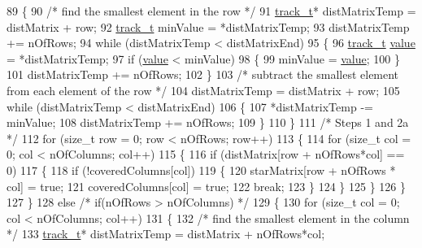 \begin{DoxyCode}
89         \{
90             \textcolor{comment}{/* find the smallest element in the row */}
91             \mbox{\hyperlink{defines_8h_a7ce9c8817b42ab418e61756f579549ab}{track\_t}}* distMatrixTemp = distMatrix + row;
92             \mbox{\hyperlink{defines_8h_a7ce9c8817b42ab418e61756f579549ab}{track\_t}}  minValue = *distMatrixTemp;
93             distMatrixTemp += nOfRows;
94             \textcolor{keywordflow}{while} (distMatrixTemp < distMatrixEnd)
95             \{
96                 \mbox{\hyperlink{defines_8h_a7ce9c8817b42ab418e61756f579549ab}{track\_t}} \mbox{\hyperlink{struct_g_m_l__token_a50b20988e3fe419332313e8d9e02c775}{value}} = *distMatrixTemp;
97                 \textcolor{keywordflow}{if} (\mbox{\hyperlink{struct_g_m_l__token_a50b20988e3fe419332313e8d9e02c775}{value}} < minValue)
98                 \{
99                     minValue = \mbox{\hyperlink{struct_g_m_l__token_a50b20988e3fe419332313e8d9e02c775}{value}};
100                 \}
101                 distMatrixTemp += nOfRows;
102             \}
103             \textcolor{comment}{/* subtract the smallest element from each element of the row */}
104             distMatrixTemp = distMatrix + row;
105             \textcolor{keywordflow}{while} (distMatrixTemp < distMatrixEnd)
106             \{
107                 *distMatrixTemp -= minValue;
108                 distMatrixTemp += nOfRows;
109             \}
110         \}
111         \textcolor{comment}{/* Steps 1 and 2a */}
112         \textcolor{keywordflow}{for} (\textcolor{keywordtype}{size\_t} row = 0; row < nOfRows; row++)
113         \{
114             \textcolor{keywordflow}{for} (\textcolor{keywordtype}{size\_t} col = 0; col < nOfColumns; col++)
115             \{
116                 \textcolor{keywordflow}{if} (distMatrix[row + nOfRows*col] == 0)
117                 \{
118                     \textcolor{keywordflow}{if} (!coveredColumns[col])
119                     \{
120                         starMatrix[row + nOfRows * col] = \textcolor{keyword}{true};
121                         coveredColumns[col] = \textcolor{keyword}{true};
122                         \textcolor{keywordflow}{break};
123                     \}
124                 \}
125             \}
126         \}
127     \}
128     \textcolor{keywordflow}{else} \textcolor{comment}{/* if(nOfRows > nOfColumns) */}
129     \{
130         \textcolor{keywordflow}{for} (\textcolor{keywordtype}{size\_t} col = 0; col < nOfColumns; col++)
131         \{
132             \textcolor{comment}{/* find the smallest element in the column */}
133             \mbox{\hyperlink{defines_8h_a7ce9c8817b42ab418e61756f579549ab}{track\_t}}* distMatrixTemp = distMatrix + nOfRows*col;

\end{DoxyCode}
